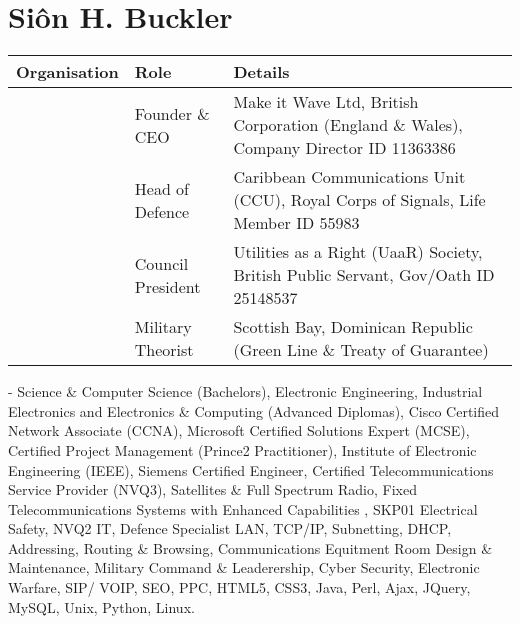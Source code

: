 \documentclass[letterpaper,10pt,english]{sphinxmanual}
\begin{document}
\section{Siôn H. Buckler}
\label{\detokenize{index:sion-h-buckler}}

\begin{savenotes}\sphinxattablestart
\centering
\begin{tabulary}{\linewidth}[t]{|T|T|T|}
\hline
\sphinxstyletheadfamily 
Organisation
&\sphinxstyletheadfamily 
Role
&\sphinxstyletheadfamily 
Details
\\
\hline
\noindent{}
&
Founder \& CEO
&
Make it Wave Ltd, British Corporation (England \& Wales), Company Director ID 11363386
\\
\hline
\noindent{}
&
Head of Defence
&
Caribbean Communications Unit (CCU), Royal Corps of Signals, Life Member ID 55983
\\
\hline
\noindent{}
&
Council President
&
Utilities as a Right (UaaR) Society, British Public Servant, Gov/Oath ID 25148537
\\
\hline
\noindent{}
&
Military Theorist
&
Scottish Bay, Dominican Republic (Green Line \& Treaty of Guarantee)
\\
\hline
\end{tabulary}
\par
\sphinxattableend\end{savenotes}

 - Science \& Computer Science (Bachelors), Electronic Engineering, Industrial Electronics and Electronics \& Computing (Advanced Diplomas), Cisco Certified Network Associate (CCNA), Microsoft Certified Solutions Expert (MCSE), Certified Project Management (Prince2 Practitioner), Institute of Electronic Engineering (IEEE), Siemens Certified Engineer, Certified Telecommunications Service Provider (NVQ3), Satellites \& Full Spectrum Radio, Fixed Telecommunications Systems with Enhanced Capabilities , SKP01 Electrical Safety, NVQ2 IT, Defence Specialist LAN, TCP/IP, Subnetting, DHCP, Addressing, Routing \& Browsing, Communications Equitment Room Design \& Maintenance, Military Command \& Leaderership,  Cyber Security, Electronic Warfare, SIP/ VOIP, SEO, PPC, HTML5, CSS3, Java, Perl, Ajax, JQuery, MySQL, Unix, Python, Linux.



\renewcommand{\indexname}{Index}
\printindex
\end{document}
